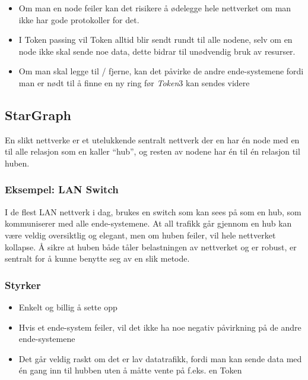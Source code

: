 \documentclass[11pt]{article}
\providecommand{\tightlist}{%
      \setlength{\itemsep}{0pt}\setlength{\parskip}{0pt}}
\begin{document}
\begin{itemize}
\tightlist
\item
  Om man en node feiler kan det risikere å ødelegge hele nettverket om
  man ikke har gode protokoller for det.
\item
  I Token passing vil Token alltid blir sendt rundt til alle nodene,
  selv om en node ikke skal sende noe data, dette bidrar til unødvendig
  bruk av resurser.
\item
  Om man skal legge til / fjerne, kan det påvirke de andre
  ende-systemene fordi man er nødt til å finne en ny ring før
  \emph{Token}3 kan sendes videre
\end{itemize}

\hypertarget{stargraph}{%
\subsection*{StarGraph}\label{stargraph}}

En slikt nettverke er et utelukkende sentralt nettverk der en har én
node med en til alle relasjon som en kaller ``hub'', og resten av nodene
har én til én relasjon til huben.

\hypertarget{eksempel-lan-switch}{%
\subsubsection*{Eksempel: LAN Switch}\label{eksempel-lan-switch}}

I de flest LAN nettverk i dag, brukes en switch som kan sees på som en
hub, som kommuniserer med alle ende-systemene. At all trafikk går
gjennom en hub kan være veldig oversiktlig og elegant, men om huben
feiler, vil hele nettverket kollapse. Å sikre at huben både tåler
belastningen av nettverket og er robust, er sentralt for å kunne benytte
seg av en slik metode.

\hypertarget{styrker-2}{%
\subsubsection*{Styrker}\label{styrker-2}}

\begin{itemize}
\tightlist
\item
  Enkelt og billig å sette opp
\item
  Hvis et ende-system feiler, vil det ikke ha noe negativ påvirkning på
  de andre ende-systemene
\item
  Det går veldig raskt om det er lav datatrafikk, fordi man kan sende
  data med én gang inn til hubben uten å måtte vente på f.eks. en Token
\end{itemize}
\end{document}
